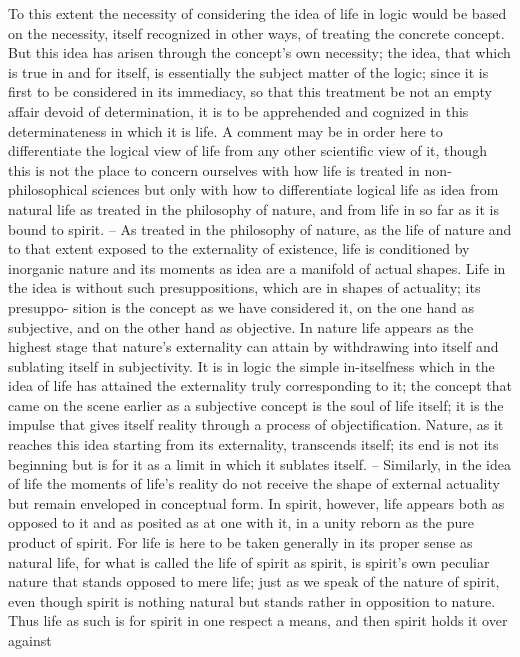 To this extent the necessity of considering the idea of life in logic would
be based on the necessity, itself recognized in other ways, of treating the
concrete concept. But this idea has arisen through the concept’s own
necessity; the idea, that which is true in and for itself, is essentially the
subject matter of the logic; since it is first to be considered in its immediacy,
so that this treatment be not an empty affair devoid of determination, it is
to be apprehended and cognized in this determinateness in which it is life.
A comment may be in order here to differentiate the logical view of life
from any other scientific view of it, though this is not the place to concern
ourselves with how life is treated in non-philosophical sciences but only
with how to differentiate logical life as idea from natural life as treated in
the philosophy of nature, and from life in so far as it is bound to spirit. – As
treated in the philosophy of nature, as the life of nature and to that extent
exposed to the externality of existence, life is conditioned by inorganic nature
and its moments as idea are a manifold of actual shapes. Life in the idea is
without such presuppositions, which are in shapes of actuality; its presuppo-
sition is the concept as we have considered it, on the one hand as subjective,
and on the other hand as objective. In nature life appears as the highest stage
that nature’s externality can attain by withdrawing into itself and sublating
itself in subjectivity. It is in logic the simple in-itselfness which in the idea
of life has attained the externality truly corresponding to it; the concept
that came on the scene earlier as a subjective concept is the soul of life itself;
it is the impulse that gives itself reality through a process of objectification.
Nature, as it reaches this idea starting from its externality, transcends itself;
its end is not its beginning but is for it as a limit in which it sublates itself. –
Similarly, in the idea of life the moments of life’s reality do not receive the
shape of external actuality but remain enveloped in conceptual form.
In spirit, however, life appears both as opposed to it and as posited as at
one with it, in a unity reborn as the pure product of spirit. For life is here
to be taken generally in its proper sense as natural life, for what is called
the life of spirit as spirit, is spirit’s own peculiar nature that stands opposed
to mere life; just as we speak of the nature of spirit, even though spirit is
nothing natural but stands rather in opposition to nature. Thus life as such
is for spirit in one respect a means, and then spirit holds it over against
